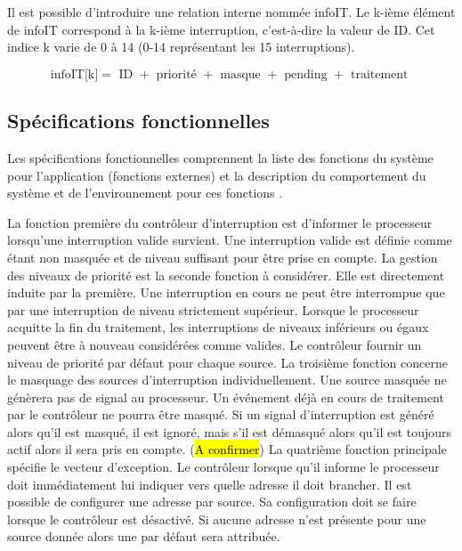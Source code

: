 Il est possible d'introduire une relation interne nommée infoIT. Le k-ième élément de infoIT correspond à la k-ième interruption, c'est-à-dire la valeur de ID. Cet indice k varie de 0 à 14 (0-14 représentant les 15 interruptions).

\begin{equation*}
	\mbox{infoIT[k]} = \mbox{ ID } + \mbox{ priorité } + \mbox{ masque } + \mbox{ pending } + \mbox{ traitement }
\end{equation*}

\newpage

\subsection{Spécifications fonctionnelles}
Les spécifications fonctionnelles comprennent la liste des fonctions du système
pour l'application (fonctions externes) et la description du comportement du système et
de l'environnement pour ces fonctions \cite{Calvez_2}.

\gap

La fonction première du contrôleur d'interruption est d'informer le processeur lorsqu'une interruption valide survient.
Une interruption valide est définie comme étant non masquée et de niveau suffisant pour être prise en compte.
La gestion des niveaux de priorité est la seconde fonction à considérer.
Elle est directement induite par la première.
Une interruption en cours ne peut être interrompue que par une interruption de niveau strictement supérieur.
Lorsque le processeur acquitte la fin du traitement, les interruptions de niveaux inférieurs ou égaux peuvent être à nouveau considérées comme valides.
Le contrôleur fournir un niveau de priorité par défaut pour chaque source.
La troisième fonction concerne le masquage des sources d'interruption individuellement.
Une source masquée ne génèrera pas de signal au processeur.
Un événement déjà en cours de traitement par le contrôleur ne pourra être masqué. %
Si un signal d'interruption est généré alors qu'il est masqué, il est ignoré, mais s'il est démasqué alors qu'il est toujours actif alors il sera pris en compte. (\hl{A confirmer})
La quatrième fonction principale spécifie le vecteur d'exception.
Le contrôleur lorsque qu'il informe le processeur doit immédiatement lui indiquer vers quelle adresse il doit brancher.
Il est possible de configurer une adresse par source.
Sa configuration doit se faire lorsque le contrôleur est désactivé.
Si aucune adresse n'est présente pour une source donnée alors une par défaut sera attribuée.

